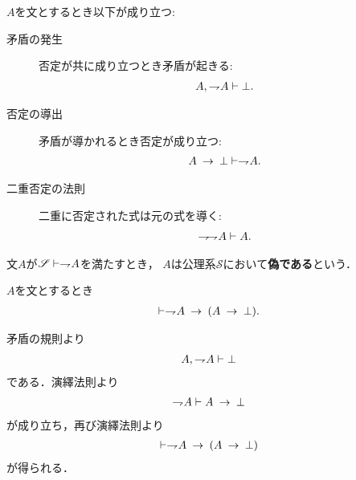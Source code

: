 	\begin{screen}
		\begin{logicalaxm}[矛盾と否定に関する規則]\label{logicalaxm:rules_of_contradiction}
			$A$を文とするとき以下が成り立つ:
			\begin{description}
				\item[矛盾の発生] 否定が共に成り立つとき矛盾が起きる:
					\begin{align}
						A, \rightharpoondown\hspace{-0.25em} A \vdash \bot.
					\end{align}
				\item[否定の導出] 矛盾が導かれるとき否定が成り立つ:
					\begin{align}
						A \hspace{0.25em}\rightarrow\hspace{0.25em} \bot \vdash \rightharpoondown\hspace{-0.25em} A.
					\end{align}
				\item[二重否定の法則] 二重に否定された式は元の式を導く:
					\begin{align}
						\rightharpoondown\hspace{-0.25em} \rightharpoondown\hspace{-0.25em} A \vdash A.
					\end{align}
			\end{description}
		\end{logicalaxm}
	\end{screen}
	
	文$A$が$\mathscr{S} \vdash \rightharpoondown\hspace{-0.25em} A$を満たすとき，
	$A$は公理系$\mathscr{S}$において{\bf 偽である}という．
	
	\begin{screen}
		\begin{logicalthm}[偽な式は矛盾を導く]\label{logicalthm:false_and_negation_are_equivalent}
			$A$を文とするとき
			\begin{align}
				\vdash \rightharpoondown\hspace{-0.25em} A \hspace{0.25em}\rightarrow\hspace{0.25em} (A \hspace{0.25em}\rightarrow\hspace{0.25em} \bot).
			\end{align}
		\end{logicalthm}
	\end{screen}
	
	\begin{prf}
		矛盾の規則より
		\begin{align}
			A,\rightharpoondown\hspace{-0.25em} A \vdash \bot
		\end{align}
		である．演繹法則より
		\begin{align}
			\rightharpoondown\hspace{-0.25em} A \vdash A \hspace{0.25em}\rightarrow\hspace{0.25em} \bot
		\end{align}
		が成り立ち，再び演繹法則より
		\begin{align}
			\vdash \rightharpoondown\hspace{-0.25em} A \hspace{0.25em}\rightarrow\hspace{0.25em} (A \hspace{0.25em}\rightarrow\hspace{0.25em} \bot)
		\end{align}
		が得られる．
		\QED
	\end{prf}
	
